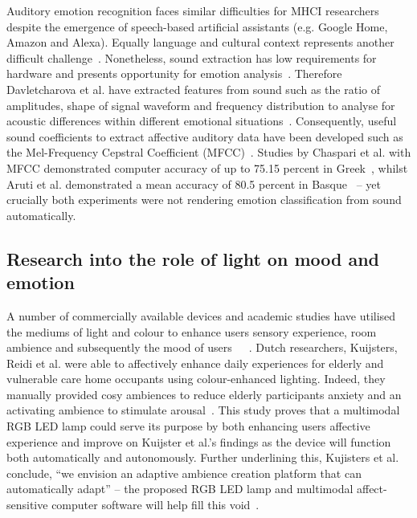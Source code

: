 \documentclass{sigchi}
\begin{document}
Auditory emotion recognition faces similar difficulties for MHCI researchers despite the emergence of speech-based artificial assistants (e.g. Google Home, Amazon and Alexa). Equally language and cultural context represents another difficult challenge~\cite{davletcharova2015detection}. Nonetheless, sound extraction has low requirements for hardware and presents opportunity for emotion analysis~\cite{marechal2019survey}. Therefore Davletcharova et al. have extracted features from sound such as the ratio of amplitudes, shape of signal waveform and frequency distribution to analyse for acoustic differences within different emotional situations~\cite{davletcharova2015detection}. Consequently, useful sound coefficients to extract affective auditory data have been developed such as the Mel-Frequency Cepstral Coefficient (MFCC)~\cite{kathiresan2019cepstral}. Studies by Chaspari et al. with MFCC demonstrated computer accuracy of up to 75.15 percent in Greek~\cite{chaspari2014emotion}, whilst Aruti et al. demonstrated a mean accuracy of 80.5 percent in Basque~\cite{davletcharova2015detection} – yet crucially both experiments were not rendering emotion classification from sound automatically.

\subsection{Research into the role of light on mood and emotion}

A number of commercially available devices and academic studies have utilised the mediums of light and colour to enhance users sensory experience, room ambience and subsequently the mood of users~\cite{flores2017effect}~\cite{kuijsters2011improving}~\cite{kuijsters2015lighting}. Dutch researchers, Kuijsters, Reidi et al. were able to affectively enhance daily experiences for elderly and vulnerable care home occupants using colour-enhanced lighting. Indeed, they manually provided cosy ambiences to reduce elderly participants anxiety and an activating ambience to stimulate arousal~\cite{kuijsters2015lighting}. This study proves that a multimodal RGB LED lamp could serve its purpose by both enhancing users affective experience and improve on Kuijster et al.’s findings as the device will function both automatically and autonomously. Further underlining this, Kujisters et al. conclude, “we envision an adaptive ambience creation platform that can automatically adapt” – the proposed RGB LED lamp and multimodal affect-sensitive computer software will help fill this void~\cite{kuijsters2015lighting}.
\end{document}
